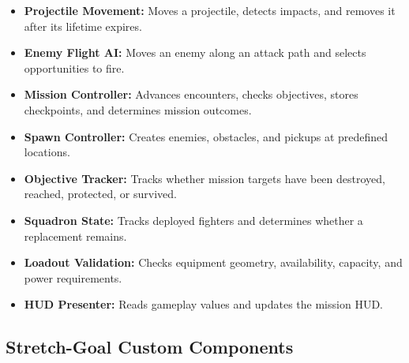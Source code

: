 \documentclass[journal]{IEEEtran}
\begin{document}
\begin{itemize}
    \item \textbf{Projectile Movement:}
    Moves a projectile, detects impacts, and removes it after its lifetime
    expires.

    \item \textbf{Enemy Flight AI:}
    Moves an enemy along an attack path and selects opportunities to fire.

    \item \textbf{Mission Controller:}
    Advances encounters, checks objectives, stores checkpoints, and determines mission outcomes.

    \item \textbf{Spawn Controller:}
    Creates enemies, obstacles, and pickups at predefined locations.

    \item \textbf{Objective Tracker:}
    Tracks whether mission targets have been destroyed, reached, protected, or survived.

    \item \textbf{Squadron State:}
    Tracks deployed fighters and determines whether a replacement remains.

    \item \textbf{Loadout Validation:}
    Checks equipment geometry, availability, capacity, and power requirements.

    \item \textbf{HUD Presenter:}
    Reads gameplay values and updates the mission HUD.

\end{itemize}


\subsection{Stretch-Goal Custom Components}
\end{document}
